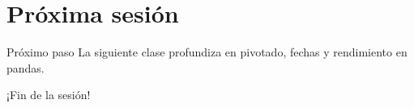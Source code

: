 \documentclass[10pt]{beamer}
\begin{document}
\section*{Próxima sesión}
\begin{frame}{Próximo paso}
La siguiente clase profundiza en pivotado, fechas y rendimiento en pandas.
\end{frame}

\begin{frame}\Huge{\centerline{¡Fin de la sesión!}}\end{frame}
\end{document}

